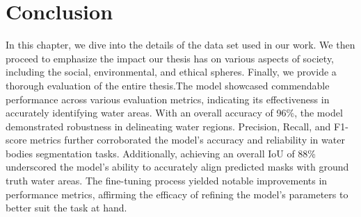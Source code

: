 \pagebreak


\section{Conclusion}

In this chapter, we dive into the details of the data set used in our work. We
then proceed to emphasize the impact our thesis has on various aspects of society,
including the social, environmental, and ethical spheres. Finally, we provide a
thorough evaluation of the entire thesis.The model showcased commendable performance across various evaluation metrics, indicating its effectiveness in accurately identifying water areas.
With an overall accuracy of 96\%, the model demonstrated robustness in delineating water regions. Precision, Recall, and F1-score metrics further corroborated the model's accuracy and reliability in water bodies segmentation tasks. Additionally, achieving an overall IoU of 88\% underscored the model's ability to accurately align predicted masks with ground truth water areas. The fine-tuning process yielded notable improvements in performance metrics, affirming the efficacy of refining the model's parameters to better suit the task at hand. 